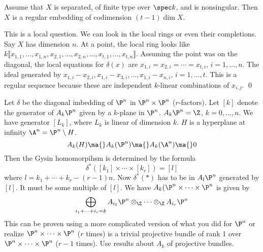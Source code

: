\begin{prop}
Assume that $X$ is separated, of finite type over $\spec k$, and is nonsingular. Then $X$ is a regular embedding of codimension $(t-1)\dim X$.
\end{prop}

\pf This is a local question. We can look in the local rings or even their completions. Say $X$ has dimension $n$. At a point, the local ring looks like $k\llbracket x_{1,1},\ldots,x_{1,n},x_{2,1},\ldots,x_{2,n},\ldots,x_{t,1},\ldots,x_{t,n} \rrbracket$. Assuming the point was on the diagonal, the local equations for $\delta(x)$ are $x_{1,i}=x_{2,i}=\cdots=x_{t,i}$, $i=1,\ldots,n$. The ideal generated by $x_{1,i}-x_{2,i},x_{1,i}-x_{3,i},\ldots,x_{1,i}-x_{n,i}$, $i=1,\ldots,t$. This is a regular sequence because these are independent $k$-linear combinations of $x_{i,j}$. \qed \\

\begin{ex}
Let $\delta$ be the diagonal imbedding of $\P^n$ in $\P^n \times \P^n$ ($r$-factors). Let $[k]$ denote the generator of $A_k \P^n$ given by a $k$-plane in $\P^n$. $A_k\P^n=\Z$, $k=0,\ldots,n$. We have generator $[L_k]$, where $L_k$ is linear of dimension $k$. $H$ is a hyperplane at infinity $\A^n=\P^n \setminus H$. 
	\[
	A_k(H) \ma{} A_k(\P^n) \ma{} A_k(\A^n) \ma{} 0
	\]
Then the Gysin homomorpihsm is determined by the formula
	\[
	\delta^*([k_1] \times \cdots \times [k_r])=[l]
	\]
where $l=k_1+\cdots+k_r-(r-1)n$. Now $\delta^*(*)$ has to be in $A_l\P^n$ generated by $[l]$. It must be some multiple of $[l]$. We have $A_k(\P^n \times \cdots \times \P^n$ is given by
	\[
	\bigoplus_{i_1+\cdots+i_r=k} A_{i_1} \P^n \otimes_\Z \cdots \otimes_\Z A_{i_r} \P^n
	\]
This can be proven using a more complicated version of what you did for $\P^n$ or realize $\P^n \times \cdots \times \P^n$ ($r$ times) is a trivial projective bundle of rank 1 over $\P^n \times \cdots \times \P^n$ ($r-1$ times). Use results about $A_k$ of projective bundles. 
\end{ex}


